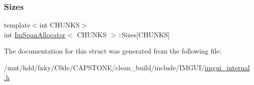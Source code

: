 \mbox{\label{structImSpanAllocator_afe77e900299427326cd6ba4f2a868897}} 
\subsubsection{\texorpdfstring{Sizes}{Sizes}}
{\footnotesize\ttfamily template$<$int C\+H\+U\+N\+KS$>$ \\
int \hyperlink{structImSpanAllocator}{Im\+Span\+Allocator}$<$ C\+H\+U\+N\+KS $>$\+::Sizes\mbox{[}C\+H\+U\+N\+KS\mbox{]}}



The documentation for this struct was generated from the following file\+:\begin{DoxyCompactItemize}
\item 
/mnt/hdd/fnky/\+C0de/\+C\+A\+P\+S\+T\+O\+N\+E/clean\+\_\+build/include/\+I\+M\+G\+U\+I/\hyperlink{imgui__internal_8h}{imgui\+\_\+internal.\+h}\end{DoxyCompactItemize}
